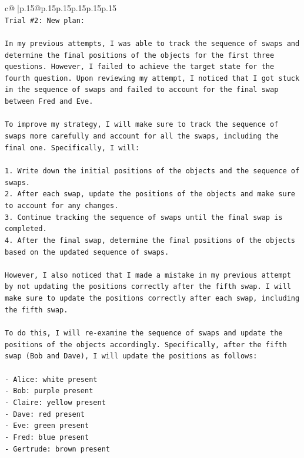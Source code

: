 \documentclass{article}
\begin{document}
{\begin{supertabular}{c@{$\;$}|p{.15\linewidth}@{}p{.15\linewidth}p{.15\linewidth}p{.15\linewidth}p{.15\linewidth}p{.15\linewidth}}
{{{\\ 
\texttt{Trial \#2: New plan: } \\
\\ 
\texttt{In my previous attempts, I was able to track the sequence of swaps and determine the final positions of the objects for the first three questions. However, I failed to achieve the target state for the fourth question. Upon reviewing my attempt, I noticed that I got stuck in the sequence of swaps and failed to account for the final swap between Fred and Eve.} \\
\\ 
\texttt{To improve my strategy, I will make sure to track the sequence of swaps more carefully and account for all the swaps, including the final one. Specifically, I will:} \\
\\ 
\texttt{1. Write down the initial positions of the objects and the sequence of swaps.} \\
\texttt{2. After each swap, update the positions of the objects and make sure to account for any changes.} \\
\texttt{3. Continue tracking the sequence of swaps until the final swap is completed.} \\
\texttt{4. After the final swap, determine the final positions of the objects based on the updated sequence of swaps.} \\
\\ 
\texttt{However, I also noticed that I made a mistake in my previous attempt by not updating the positions correctly after the fifth swap. I will make sure to update the positions correctly after each swap, including the fifth swap.} \\
\\ 
\texttt{To do this, I will re{-}examine the sequence of swaps and update the positions of the objects accordingly. Specifically, after the fifth swap (Bob and Dave), I will update the positions as follows:} \\
\\ 
\texttt{{-} Alice: white present} \\
\texttt{{-} Bob: purple present} \\
\texttt{{-} Claire: yellow present} \\
\texttt{{-} Dave: red present} \\
\texttt{{-} Eve: green present} \\
\texttt{{-} Fred: blue present} \\
\texttt{{-} Gertrude: brown present} \\
}}}
\end{supertabular}}
\end{document}

